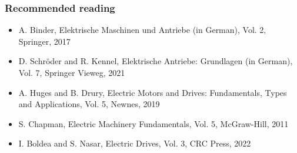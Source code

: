 \begin{frame}
	\frametitle{Recommended reading}
	\begin{itemize}
		\item A. Binder, Elektrische Maschinen und Antriebe (in German), Vol. 2, Springer, 2017
		\item D. Schr\"oder and R. Kennel, Elektrische Antriebe: Grundlagen (in German), Vol. 7, Springer Vieweg, 2021
		\item A. Huges and B. Drury, Electric Motors and Drives: Fundamentals, Types and Applications, Vol. 5, Newnes, 2019
		\item S. Chapman, Electric Machinery Fundamentals, Vol. 5, McGraw-Hill, 2011
		\item I. Boldea and S. Nasar, Electric Drives, Vol. 3, CRC Press, 2022
	\end{itemize}
\end{frame}
